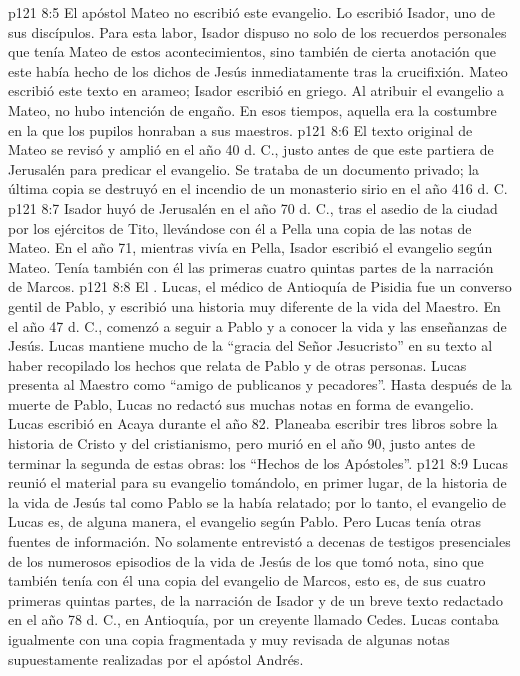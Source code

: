 \vs p121 8:5 El apóstol Mateo no escribió este evangelio. Lo escribió Isador, uno de sus discípulos. Para esta labor, Isador dispuso no solo de los recuerdos personales que tenía Mateo de estos acontecimientos, sino también de cierta anotación que este había hecho de los dichos de Jesús inmediatamente tras la crucifixión. Mateo escribió este texto en arameo; Isador escribió en griego. Al atribuir el evangelio a Mateo, no hubo intención de engaño. En esos tiempos, aquella era la costumbre en la que los pupilos honraban a sus maestros.
\vs p121 8:6 El texto original de Mateo se revisó y amplió en el año 40 d. C., justo antes de que este partiera de Jerusalén para predicar el evangelio. Se trataba de un documento privado; la última copia se destruyó en el incendio de un monasterio sirio en el año 416 d. C.
\vs p121 8:7 Isador huyó de Jerusalén en el año 70 d. C., tras el asedio de la ciudad por los ejércitos de Tito, llevándose con él a Pella una copia de las notas de Mateo. En el año 71, mientras vivía en Pella, Isador escribió el evangelio según Mateo. Tenía también con él las primeras cuatro quintas partes de la narración de Marcos.
\vs p121 8:8 El . Lucas, el médico de Antioquía de Pisidia fue un converso gentil de Pablo, y escribió una historia muy diferente de la vida del Maestro. En el año 47 d. C., comenzó a seguir a Pablo y a conocer la vida y las enseñanzas de Jesús. Lucas mantiene mucho de la “gracia del Señor Jesucristo” en su texto al haber recopilado los hechos que relata de Pablo y de otras personas. Lucas presenta al Maestro como “amigo de publicanos y pecadores”. Hasta después de la muerte de Pablo, Lucas no redactó sus muchas notas en forma de evangelio. Lucas escribió en Acaya durante el año 82. Planeaba escribir tres libros sobre la historia de Cristo y del cristianismo, pero murió en el año 90, justo antes de terminar la segunda de estas obras: los “Hechos de los Apóstoles”.
\vs p121 8:9 Lucas reunió el material para su evangelio tomándolo, en primer lugar, de la historia de la vida de Jesús tal como Pablo se la había relatado; por lo tanto, el evangelio de Lucas es, de alguna manera, el evangelio según Pablo. Pero Lucas tenía otras fuentes de información. No solamente entrevistó a decenas de testigos presenciales de los numerosos episodios de la vida de Jesús de los que tomó nota, sino que también tenía con él una copia del evangelio de Marcos, esto es, de sus cuatro primeras quintas partes, de la narración de Isador y de un breve texto redactado en el año 78 d. C., en Antioquía, por un creyente llamado Cedes. Lucas contaba igualmente con una copia fragmentada y muy revisada de algunas notas supuestamente realizadas por el apóstol Andrés.
